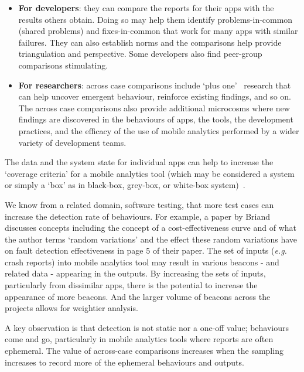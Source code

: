 \begin{itemize}
    \item \textbf{For developers}: they can compare the reports for their apps with the results others obtain. Doing so may help them identify problems-in-common (shared problems) and fixes-in-common that work for many apps with similar failures. They can also establish norms and the comparisons help provide triangulation and perspective. Some developers also find peer-group comparisons stimulating.
    
    \item \textbf{For researchers}: across case comparisons include `plus one'~\citep[pp 28-29]{aurini2016_how_to_of_qualitative_research} research that can help uncover emergent behaviour, reinforce existing findings, and so on. The across case comparisons also provide additional microcosms where new findings are discovered in the behaviours of apps, the tools, the development practices, and the efficacy of the use of mobile analytics performed by a wider variety of development teams.
\end{itemize}


The data and the system state for individual apps can help to increase the `coverage criteria' for a mobile analytics tool (which may be considered a system or simply a `box' as in black-box, grey-box, or white-box system)~. 

We know from a related domain, software testing, that more test cases can increase the detection rate of behaviours. For example, a paper by Briand~\citet{briand2007_a_critical_analysis_of_empirical_research_in_software_testing} discusses concepts including the concept of a cost-effectiveness curve and of what the author terms `random variations' and the effect these random variations have on fault detection effectiveness in page 5 of their paper. The set of inputs (\textit{e.g.} crash reports) into mobile analytics tool may result in various beacons - and related data - appearing in the outputs. By increasing the sets of inputs, particularly from dissimilar apps, there is the potential to increase the appearance of more beacons. And the larger volume of beacons across the projects allows for weightier analysis.

A key observation is that detection is not static nor a one-off value; behaviours come and go, particularly in mobile analytics tools where reports are often ephemeral. The value of across-case comparisons increases when the sampling increases to record more of the ephemeral behaviours and outputs.

